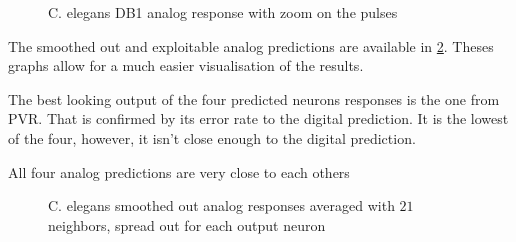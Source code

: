 \begin{figure}[H]
  \centering
  
  \caption{\acs{C. elegans} DB1 analog response with zoom on the pulses}
  \label{graph:zoom5Celegans}
\end{figure}

The smoothed out and exploitable analog predictions are available in \cref{graph:smooth5Celegans}. Theses graphs allow for a much easier visualisation of the results.

The best looking output of the four predicted neurons responses is the one from PVR. That is confirmed by its error rate to the digital prediction. It is the lowest of the four, however, it isn't close enough to the digital prediction.

All four analog predictions are very close to each others

\begin{figure}[H]
  \centering
  \begin{minipage}{\columnwidth}
    \hfill
  \end{minipage}
  \begin{minipage}{\columnwidth}
    \hfill
  \end{minipage}
  \caption{\ac{C. elegans} smoothed out analog responses averaged with $21$ neighbors, spread out for each output neuron}
  \label{graph:smooth5Celegans}
\end{figure}
